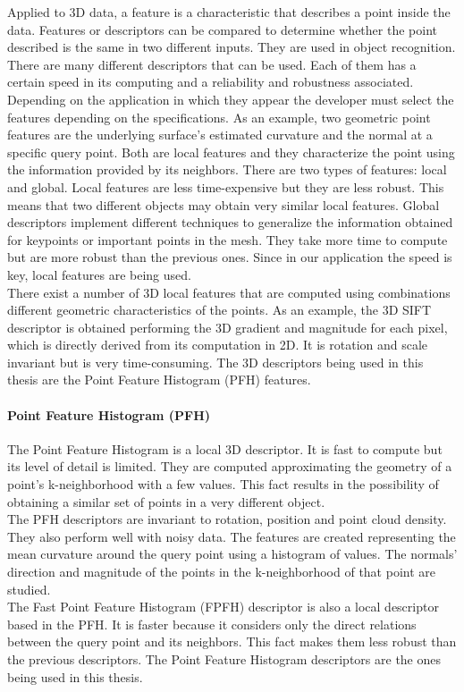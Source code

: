 Applied to 3D data, a feature is a characteristic that describes a point inside the data. Features or descriptors can be compared to determine whether the point described is the same in two different inputs. They are used in object recognition. 
There are many different descriptors that can be used. Each of them has a certain speed in its computing and a reliability and robustness associated. Depending on the application in which they appear the developer must select the features depending on the specifications. 
As an example, two geometric point features are the underlying surface's estimated curvature and the normal at a specific query point. 
Both are local features and they characterize the point using the information provided by its neighbors. 
There are two types of features: local and global. 
Local features are less time-expensive but they are less robust. 
This means that two different objects may obtain very similar local features.
Global descriptors implement different techniques to generalize the information obtained for keypoints or important points in the mesh. 
They take more time to compute but are more robust than the previous ones. 
Since in our application the speed is key, local features are being used. 
\\

There exist a number of 3D local features that are computed using combinations different geometric characteristics of the points. 
As an example, the 3D SIFT descriptor \cite{Scovanner2007} is obtained performing the 3D gradient and magnitude for each pixel, which is directly derived from its computation in 2D. 
It is rotation and scale invariant but is very time-consuming. 
The 3D descriptors being used in this thesis are the Point Feature Histogram (PFH) features. 

\paragraph{Point Feature Histogram (PFH)}\mbox{}
\label{pfh}

The Point Feature Histogram \cite{Rusu2008} is a local 3D descriptor. 
It is fast to compute but its level of detail is limited. 
They are computed approximating the geometry of a point's k-neighborhood with a few values. 
This fact results in the possibility of obtaining a similar set of points in a very different object. 
\\

The PFH descriptors are invariant to rotation, position and point cloud density. 
They also perform well with noisy data. 
The features are created representing the mean curvature around the query point using a histogram of values. 
The normals' direction and magnitude of the points in the k-neighborhood of that point are studied. 
\\

The Fast Point Feature Histogram (FPFH) \cite{Rusu} descriptor is also a local descriptor based in the PFH. 
It is faster because it considers only the direct relations between the query point and its neighbors.
This fact makes them less robust than the previous descriptors. 
The Point Feature Histogram descriptors are the ones being used in this thesis. 


